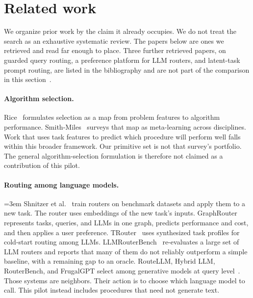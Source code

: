 \section{Related work}
\label{sec:related}

We organize prior work by the claim it already occupies. We do not treat the search as an exhaustive systematic review. The papers below are ones we retrieved and read far enough to place. Three further retrieved papers, on guarded query routing, a preference platform for LLM routers, and latent-task prompt routing, are listed in the bibliography and are not part of the comparison in this section~\citep{sleher2025,lai2026,zhang2026finerouter}.

\paragraph{Algorithm selection.}
Rice~\citeyearpar{rice1976} formulates selection as a map from problem features to algorithm performance. Smith-Miles~\citeyearpar{smithmiles2009} surveys that map as meta-learning across disciplines. Work that uses task features to predict which procedure will perform well falls within this broader framework. Our primitive set is not that survey's portfolio. The general algorithm-selection formulation is therefore not claimed as a contribution of this pilot.

\paragraph{Routing among language models.}
{\emergencystretch=3em
Shnitzer et al.~\citeyearpar{shnitzer2023} train routers on benchmark datasets and apply them to a new task. The router uses embeddings of the new task's inputs. GraphRouter~\citep{feng2024} represents tasks, queries, and LLMs in one graph, predicts performance and cost, and then applies a user preference. TRouter~\citep{liu2026trouter} uses synthesized task profiles for cold-start routing among LLMs. LLMRouterBench~\citep{li2026llmrouterbench} re-evaluates a large set of LLM routers and reports that many of them do not reliably outperform a simple baseline, with a remaining gap to an oracle. RouteLLM, Hybrid LLM, RouterBench, and FrugalGPT select among generative models at query level~\citep{ong2024,ding2024,hu2024,chen2023}. Those systems are neighbors. Their action is to choose which language model to call. This pilot instead includes procedures that need not generate text.
\par}

